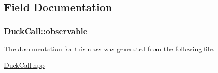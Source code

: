 \subsection{Field Documentation}
\hypertarget{classDuckCall_ab9d3e8941fd92173090121e7bce0317a}{
\subsubsection[{observable}]{ Duck\-Call\-::observable\hspace{0.3cm}{\ttfamily [private]}}}\label{classDuckCall_ab9d3e8941fd92173090121e7bce0317a}


The documentation for this class was generated from the following file\-:\begin{DoxyCompactItemize}
\item 
\hyperlink{DuckCall_8hpp}{Duck\-Call.\-hpp}\end{DoxyCompactItemize}
